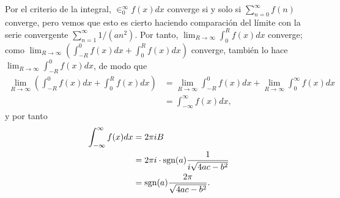 {\begin{itemize}
$$         $$
         Por el criterio de la integral, $\in_{0}^{\infty}f(x)dx$ converge si y solo si $\sum_{n=0}^{\infty}f(n)$ converge, pero vemos que esto es cierto haciendo comparación del límite con la serie convergente $\sum_{n=1}^{\infty}1/(an^2)$. Por tanto, $\lim_{R\to\infty}\int_{0}^{R}f(x)dx$ converge; como $\lim_{R\to\infty}\left( \int_{-R}^{0}f(x)dx+\int_{0}^{R}f(x)dx\right)$ converge, también lo hace $\lim_{R\to\infty}\int_{-R}^{0}f(x)dx$, de modo que
         $$
         \begin{aligned}
            \lim_{R\to\infty}\left( \int_{-R}^{0}f(x)dx+\int_{0}^{R}f(x)dx\right)&=\lim_{R\to\infty}\int_{-R}^{0}f(x)dx+\lim_{R\to\infty}\int_{0}^{\infty}f(x)dx\\
                                                                                               &=\int_{-\infty}^{\infty} f(x)dx,
         \end{aligned}
         $$
         y por tanto
         $$
         \begin{aligned}
            \int_{-\infty}^{\infty}f(x)dx&=2\pi i B\\
                                         &=2\pi i\cdot\normalfont{\text{sgn}}(a)\frac{1}{i\sqrt{4ac-b^2}}\\
                                         &=\normalfont{\text{sgn}}(a)\frac{2\pi}{\sqrt{4ac-b^2}}.
         \end{aligned}
         $$


   \end{itemize}
  }
\hfill\qedsymbol
